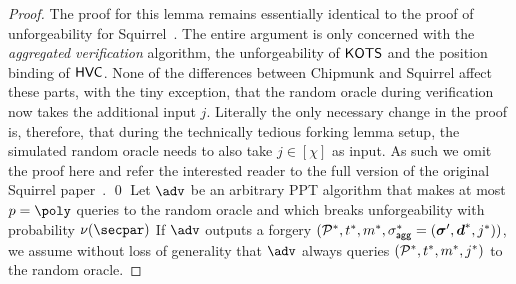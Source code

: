 \begin{proof}
  The proof for this lemma remains essentially identical to the proof of unforgeability for Squirrel~\cite{CCS:FleSimZha22}.
  The entire argument is only concerned with the \emph{aggregated verification} algorithm, the unforgeability of $\mathsf{KOTS}$ and the position binding of $\mathsf{HVC}$.
  None of the differences between Chipmunk and Squirrel affect these parts, with the tiny exception, that the random oracle during verification now takes the additional input $j$.
  Literally the only necessary change in the proof is, therefore, that during the technically tedious forking lemma setup, the simulated random oracle needs to also take $j\in[\chi]$ as input.
  As such we omit the proof here and refer the interested reader to the full version of the original Squirrel paper~\cite{CCS:FleSimZha22}. \qed
  \iffalse
  Let $\adv$ be an arbitrary PPT algorithm that makes at most $p=\poly$ queries to the random oracle and which breaks unforgeability with probability $\nu(\secpar)$
  If $\adv$ outputs a forgery $(\mathcal{P}^*,t^*,m^*,\sigma_\mathsf{agg}^*=(\boldsymbol{\sigma}',\boldsymbol{d}^*,j^*))$, we assume without loss of generality that $\adv$ always queries $(\mathcal{P}^*,t^*,m^*,j^*)$ to the random oracle.
  

\end{proof}
